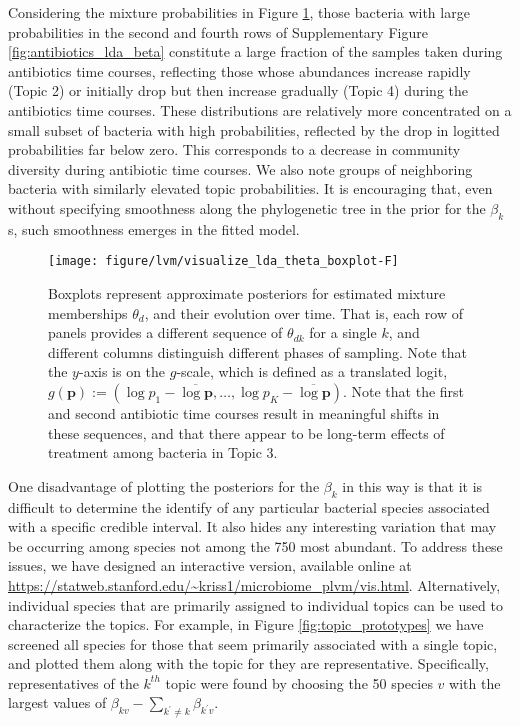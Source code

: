 Considering the mixture probabilities in Figure \ref{fig:antibiotics_lda_theta},
those bacteria with large probabilities in the second and fourth rows of
Supplementary Figure \ref{fig:antibiotics_lda_beta} constitute a large fraction
of the samples taken during antibiotics time courses, reflecting those whose
abundances increase rapidly (Topic 2) or initially drop but then increase
gradually (Topic 4) during the antibiotics time courses. These distributions are
relatively more concentrated on a small subset of bacteria with high
probabilities, reflected by the drop in logitted probabilities far below zero.
This corresponds to a decrease in community diversity during antibiotic time
courses. We also note groups of neighboring bacteria with similarly elevated
topic probabilities. It is encouraging that, even without specifying smoothness
along the phylogenetic tree in the prior for the $\beta_{k}$s, such smoothness
emerges in the fitted model.

\begin{figure}
  \centering\texttt{[image: figure/lvm/visualize\_lda\_theta\_boxplot-F]}
  \caption{Boxplots represent approximate posteriors for estimated mixture
    memberships $\theta_{d}$, and their evolution over time. That is, each row
    of panels provides a different sequence of $\theta_{dk}$ for a single $k$,
    and different columns distinguish different phases of sampling. Note that
    the $y$-axis is on the $g$-scale, which is defined as a translated logit,
    $g\left(\mathbf{p}\right) := \left(\log p_{1} - \overline{\log \mathbf{p}},
    \dots,\log p_{K} - \overline{\log \mathbf{p}}\right)$. Note that the first
    and second antibiotic time courses result in meaningful shifts in these
    sequences, and that there appear to be long-term effects of treatment among
    bacteria in Topic 3. \label{fig:antibiotics_lda_theta}}
\end{figure}

One disadvantage of plotting the posteriors for the $\beta_{k}$ in this way is
that it is difficult to determine the identify of any particular bacterial
species associated with a specific credible interval. It also hides any
interesting variation that may be occurring among species not among the 750 most
abundant. To address these issues, we have designed an interactive version,
available online at
\url{https://statweb.stanford.edu/~kriss1/microbiome_plvm/vis.html}.
Alternatively, individual species that are primarily assigned to individual
topics can be used to characterize the topics. For example, in Figure
\ref{fig:topic_prototypes} we have screened all species for those that seem
primarily associated with a single topic, and plotted them along with the topic
for they are representative. Specifically, representatives of the $k^{th}$ topic
were found by choosing the 50 species $v$ with the largest values of $\beta_{kv}
- \sum_{k^{\prime} \neq k} \beta_{k^{\prime} v}$.

